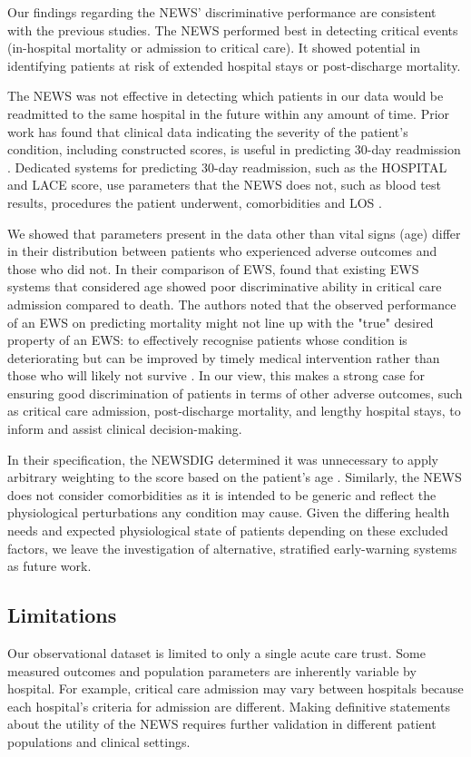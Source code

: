 \documentclass[10pt,journal, compsoc]{IEEEtran}
\begin{document}
Our findings regarding the NEWS' discriminative performance are consistent with the previous studies. The NEWS performed best in detecting critical events (in-hospital mortality or admission to critical care). It showed potential in identifying patients at risk of extended hospital stays or post-discharge mortality.

The NEWS was not effective in detecting which patients in our data would be readmitted to the same hospital in the future within any amount of time. Prior work has found that clinical data indicating the severity of the patient's condition, including constructed scores, is useful in predicting 30-day readmission \cite[pp.~5]{Mahmoudim20}. Dedicated systems for predicting 30-day readmission, such as the HOSPITAL and LACE score, use parameters that the NEWS does not, such as blood test results, procedures the patient underwent, comorbidities and LOS \cite{Donze13}.

We showed that parameters present in the data other than vital signs (age) differ in their distribution between patients who experienced adverse outcomes and those who did not. In their comparison of EWS, \cite{Smith13} found that existing EWS systems that considered age showed poor discriminative ability in critical care admission compared to death. The authors noted that the observed performance of an EWS on predicting mortality might not line up with the "true" desired property of an EWS: to effectively recognise patients whose condition is deteriorating but can be improved by timely medical intervention rather than those who will likely not survive \cite[pp.~4]{Smith13}. In our view, this makes a strong case for ensuring good discrimination of patients in terms of other adverse outcomes, such as critical care admission, post-discharge mortality, and lengthy hospital stays, to inform and assist clinical decision-making.

In their specification, the NEWSDIG determined it was unnecessary to apply arbitrary weighting to the score based on the patient's age \cite[pp.~19]{RCP17}. Similarly, the NEWS does not consider comorbidities as it is intended to be generic and reflect the physiological perturbations any condition may cause. Given the differing health needs and expected physiological state of patients depending on these excluded factors, we leave the investigation of alternative, stratified early-warning systems as future work.

\subsection{Limitations}
Our observational dataset is limited to only a single acute care trust. Some measured outcomes and population parameters are inherently variable by hospital. For example, critical care admission may vary between hospitals because each hospital's criteria for admission are different. Making definitive statements about the utility of the NEWS requires further validation in different patient populations and clinical settings.
\end{document}
